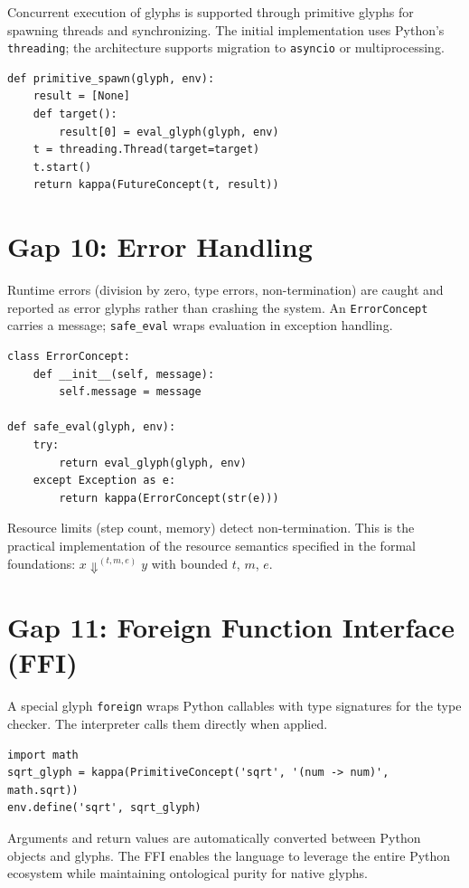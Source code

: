 \documentclass[12pt, letterpaper]{book}
\begin{document}
Concurrent execution of glyphs is supported through primitive glyphs for spawning threads and synchronizing. The initial implementation uses Python's \texttt{threading}; the architecture supports migration to \texttt{asyncio} or multiprocessing.

\begin{verbatim}
def primitive_spawn(glyph, env):
    result = [None]
    def target():
        result[0] = eval_glyph(glyph, env)
    t = threading.Thread(target=target)
    t.start()
    return kappa(FutureConcept(t, result))
\end{verbatim}

\section{Gap 10: Error Handling}

Runtime errors (division by zero, type errors, non-termination) are caught and reported as error glyphs rather than crashing the system. An \texttt{ErrorConcept} carries a message; \texttt{safe\_eval} wraps evaluation in exception handling.

\begin{verbatim}
class ErrorConcept:
    def __init__(self, message):
        self.message = message

def safe_eval(glyph, env):
    try:
        return eval_glyph(glyph, env)
    except Exception as e:
        return kappa(ErrorConcept(str(e)))
\end{verbatim}

Resource limits (step count, memory) detect non-termination. This is the practical implementation of the resource semantics specified in the formal foundations: $x \Downarrow^{(t,m,e)} y$ with bounded $t$, $m$, $e$.

\section{Gap 11: Foreign Function Interface (FFI)}

A special glyph \texttt{foreign} wraps Python callables with type signatures for the type checker. The interpreter calls them directly when applied.

\begin{verbatim}
import math
sqrt_glyph = kappa(PrimitiveConcept('sqrt', '(num -> num)', math.sqrt))
env.define('sqrt', sqrt_glyph)
\end{verbatim}

Arguments and return values are automatically converted between Python objects and glyphs. The FFI enables the language to leverage the entire Python ecosystem while maintaining ontological purity for native glyphs.
\end{document}
